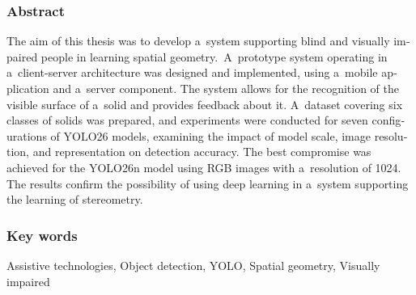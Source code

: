\subsubsection*{Abstract}
\begin{otherlanguage}{british}
    The aim of this thesis was to develop a~system supporting blind and visually impaired people in learning spatial geometry.~A~prototype system operating in a~client-server architecture was designed and implemented, using a~mobile application and a~server component. The system allows for the recognition of the visible surface of a~solid and provides feedback about it. A~dataset covering six classes of solids was prepared, and experiments were conducted for seven configurations of YOLO26 models, examining the impact of model scale, image resolution, and representation on detection accuracy. The best compromise was achieved for the YOLO26n model using RGB images with a~resolution of 1024. The results confirm the possibility of using deep learning in a~system supporting the learning of stereometry.


\end{otherlanguage}
\subsubsection*{Key words}
\begin{otherlanguage}{british}
    Assistive technologies, Object detection, YOLO, Spatial geometry, Visually impaired

\end{otherlanguage}

